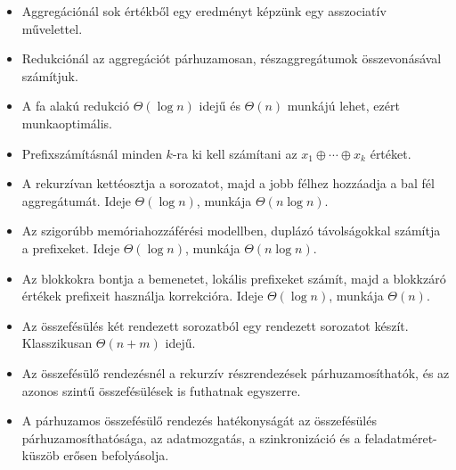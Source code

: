 \begin{itemize}
  \item Aggregációnál sok értékből egy eredményt képzünk egy asszociatív művelettel.
  \item Redukciónál az aggregációt párhuzamosan, részaggregátumok összevonásával számítjuk.
  \item A fa alakú redukció $\Theta(\log n)$ idejű és $\Theta(n)$ munkájú lehet, ezért munkaoptimális.
  \item Prefixszámításnál minden $k$-ra ki kell számítani az $x_1\oplus\cdots\oplus x_k$ értéket.
  \item A  rekurzívan kettéosztja a sorozatot, majd a jobb félhez hozzáadja a bal fél aggregátumát. Ideje $\Theta(\log n)$, munkája $\Theta(n\log n)$.
  \item Az  szigorúbb memóriahozzáférési modellben, duplázó távolságokkal számítja a prefixeket. Ideje $\Theta(\log n)$, munkája $\Theta(n\log n)$.
  \item Az  blokkokra bontja a bemenetet, lokális prefixeket számít, majd a blokkzáró értékek prefixeit használja korrekcióra. Ideje $\Theta(\log n)$, munkája $\Theta(n)$.
  \item Az összefésülés két rendezett sorozatból egy rendezett sorozatot készít. Klasszikusan $\Theta(n+m)$ idejű.
  \item Az összefésülő rendezésnél a rekurzív részrendezések párhuzamosíthatók, és az azonos szintű összefésülések is futhatnak egyszerre.
  \item A párhuzamos összefésülő rendezés hatékonyságát az összefésülés párhuzamosíthatósága, az adatmozgatás, a szinkronizáció és a feladatméret-küszöb erősen befolyásolja.
\end{itemize}
